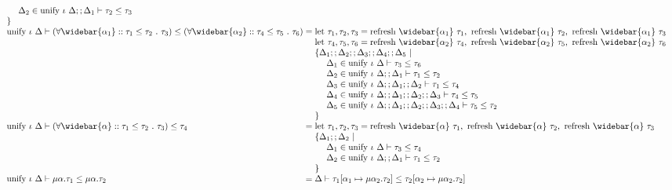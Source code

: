 \documentclass[sigplan,screen]{acmart}
\begin{document}
\begin{figure*}[h]
\[\begin{array}{l @{} l}
\begin{array}[t]{@{} l}
        \ \ \ \ \Delta_2 \in \text{unify } \iota\ \Delta;;\Delta_1 \vdash \tau_2 \leq \tau_3
        \\
        \}
      \end{array}
      \\
      \text{unify } \iota\ \Delta \vdash
      (\forall \widebar{\alpha_1} :: \tau_1 \leq \tau_2\ .\ \tau_3)
      \leq 
      (\forall \widebar{\alpha_2} :: \tau_4 \leq \tau_5\ .\ \tau_6)
      &{} = 
      \begin{array}[t]{@{} l}
        \text{let } \tau_1, \tau_2, \tau_3 = 
        \text{refresh } \widebar{\alpha_1}\ \tau_1,\ 
        \text{refresh } \widebar{\alpha_1}\ \tau_2,\ 
        \text{refresh } \widebar{\alpha_1}\ \tau_3
        \\
        \text{let } \tau_4, \tau_5, \tau_6 = 
        \text{refresh } \widebar{\alpha_2}\ \tau_4,\ 
        \text{refresh } \widebar{\alpha_2}\ \tau_5,\ 
        \text{refresh } \widebar{\alpha_2}\ \tau_6
        \\
        \{\Delta_1;;\Delta_2;;\Delta_3;;\Delta_4;;\Delta_5\ |
        \\ 
        \ \ \ \ \Delta_1 \in \text{unify } \iota\ \Delta \vdash \tau_3 \leq \tau_6
        \\
        \ \ \ \ \Delta_2 \in \text{unify } \iota\ \Delta;;\Delta_1 \vdash \tau_1 \leq \tau_2
        \\ 
        \ \ \ \ \Delta_3 \in \text{unify } \iota\ \Delta;;\Delta_1;;\Delta_2 \vdash \tau_1 \leq \tau_4
        \\ 
        \ \ \ \ \Delta_4 \in \text{unify } \iota\ \Delta;;\Delta_1;;\Delta_2;;\Delta_3 \vdash \tau_4 \leq \tau_5
        \\ 
        \ \ \ \ \Delta_5 \in \text{unify } \iota\ \Delta;;\Delta_1;;\Delta_2;;\Delta_3;;\Delta_4 \vdash \tau_5 \leq \tau_2
        \\
        \}
      \end{array}
      \\
      \text{unify } \iota\ \Delta \vdash
      (\forall \widebar{\alpha} :: \tau_1 \leq \tau_2\ .\ \tau_3)
      \leq 
      \tau_4
      &{} = 
      \begin{array}[t]{@{} l}
        \text{let } \tau_1, \tau_2, \tau_3 = 
        \text{refresh } \widebar{\alpha}\ \tau_1,\ 
        \text{refresh } \widebar{\alpha}\ \tau_2,\ 
        \text{refresh } \widebar{\alpha}\ \tau_3
        \\
        \{\Delta_1;;\Delta_2\ |
        \\ 
        \ \ \ \ \Delta_1 \in \text{unify } \iota\ \Delta \vdash \tau_3 \leq \tau_4
        \\
        \ \ \ \ \Delta_2 \in \text{unify } \iota\ \Delta;;\Delta_1 \vdash \tau_1 \leq \tau_2
        \\
        \}
      \end{array}
      \\
      \text{unify } \iota\ \Delta \vdash
      \mu \alpha . \tau_1 \leq \mu \alpha . \tau_2
      &{} = 
      \Delta \vdash 
      \tau_1[\alpha_1\mapsto\mu\alpha_2.\tau_2] \leq 
      \tau_2[\alpha_2\mapsto\mu\alpha_2.\tau_2]


\end{array}\]
\end{figure*}
\end{document}
